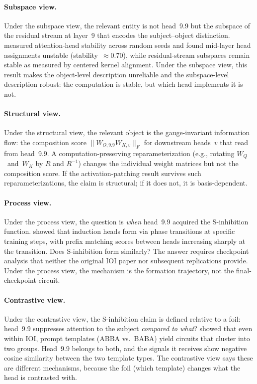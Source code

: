 \documentclass{article}
\begin{document}
\paragraph{Subspace view.}
Under the subspace view, the relevant entity is not head~9.9 but the
subspace of the residual stream at layer~9 that encodes the
subject--object distinction.  \citet{bali2026} measured attention-head
stability across random seeds and found mid-layer head assignments
unstable (stability~$\approx$0.70), while residual-stream subspaces
remain stable as measured by centered kernel alignment.
Under the subspace view, this result makes the object-level description
unreliable and the subspace-level description robust: the computation
is stable, but which head implements it is not.

\paragraph{Structural view.}
Under the structural view, the relevant object is the gauge-invariant
information flow: the composition score $\|W_{O,\text{9.9}} W_{K,v}\|_F$
for downstream heads~$v$ that read from head~9.9.
A computation-preserving reparameterization (e.g., rotating
$W_Q$~and~$W_K$ by $R$ and $R^{-1}$) changes the individual weight
matrices but not the composition score.  If the activation-patching
result survives such reparameterizations, the claim is structural;
if it does not, it is basis-dependent.

\paragraph{Process view.}
Under the process view, the question is \emph{when} head~9.9 acquired
the S-inhibition function.  \citet{olsson2022} showed that induction
heads form via phase transitions at specific training steps, with
prefix matching scores between heads increasing sharply at the transition.
Does S-inhibition form similarly?  The answer requires checkpoint
analysis that neither the original IOI paper nor subsequent
replications provide.  Under the process view, the mechanism is
the formation trajectory, not the final-checkpoint circuit.

\paragraph{Contrastive view.}
Under the contrastive view, the S-inhibition claim is defined relative
to a foil: head~9.9 suppresses attention to the subject
\emph{compared to what}?  \citet{franco2026} showed that even within
IOI, prompt templates (ABBA vs.\ BABA) yield circuits that cluster into
two groups.  Head~9.9 belongs to both, and the signals it receives show
negative cosine similarity between the two template types.
The contrastive view says these are different mechanisms, because the
foil (which template) changes what the head is contrasted with.
\end{document}
